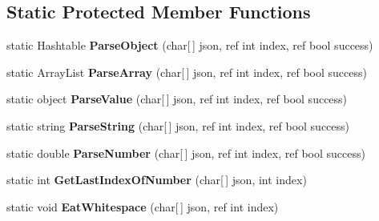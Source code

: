 \subsection*{\-Static \-Protected \-Member \-Functions}
\begin{DoxyCompactItemize}
\item 
\hypertarget{classProcurios_1_1Public_1_1JSON_af852c7ed4890451db945c293a379d167}{static \-Hashtable {\bfseries \-Parse\-Object} (char\mbox{[}$\,$\mbox{]} json, ref int index, ref bool success)}\label{classProcurios_1_1Public_1_1JSON_af852c7ed4890451db945c293a379d167}

\item 
\hypertarget{classProcurios_1_1Public_1_1JSON_aff252e51e51c76379df2e8b40b576d86}{static \-Array\-List {\bfseries \-Parse\-Array} (char\mbox{[}$\,$\mbox{]} json, ref int index, ref bool success)}\label{classProcurios_1_1Public_1_1JSON_aff252e51e51c76379df2e8b40b576d86}

\item 
\hypertarget{classProcurios_1_1Public_1_1JSON_a4f7e2cc33426af7ded9d103e5f23d2d2}{static object {\bfseries \-Parse\-Value} (char\mbox{[}$\,$\mbox{]} json, ref int index, ref bool success)}\label{classProcurios_1_1Public_1_1JSON_a4f7e2cc33426af7ded9d103e5f23d2d2}

\item 
\hypertarget{classProcurios_1_1Public_1_1JSON_a5c5148412fd6dca5b5ee9be8c941badb}{static string {\bfseries \-Parse\-String} (char\mbox{[}$\,$\mbox{]} json, ref int index, ref bool success)}\label{classProcurios_1_1Public_1_1JSON_a5c5148412fd6dca5b5ee9be8c941badb}

\item 
\hypertarget{classProcurios_1_1Public_1_1JSON_a9fc88d5958596687e2f0c6134ca01ff1}{static double {\bfseries \-Parse\-Number} (char\mbox{[}$\,$\mbox{]} json, ref int index, ref bool success)}\label{classProcurios_1_1Public_1_1JSON_a9fc88d5958596687e2f0c6134ca01ff1}

\item 
\hypertarget{classProcurios_1_1Public_1_1JSON_a462d244f6c9abc1bcfe488cc50b10fb5}{static int {\bfseries \-Get\-Last\-Index\-Of\-Number} (char\mbox{[}$\,$\mbox{]} json, int index)}\label{classProcurios_1_1Public_1_1JSON_a462d244f6c9abc1bcfe488cc50b10fb5}

\item 
\hypertarget{classProcurios_1_1Public_1_1JSON_a75cab5c641db9ca8275b21d3a6b891e4}{static void {\bfseries \-Eat\-Whitespace} (char\mbox{[}$\,$\mbox{]} json, ref int index)}\label{classProcurios_1_1Public_1_1JSON_a75cab5c641db9ca8275b21d3a6b891e4}


\end{DoxyCompactItemize}
